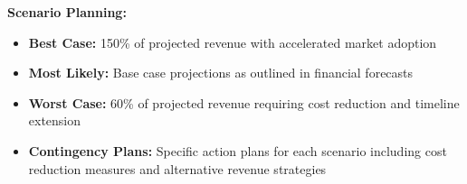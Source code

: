 \textbf{Scenario Planning:}
\begin{itemize}
    \item \textbf{Best Case:} 150\% of projected revenue with accelerated market adoption
    \item \textbf{Most Likely:} Base case projections as outlined in financial forecasts
    \item \textbf{Worst Case:} 60\% of projected revenue requiring cost reduction and timeline extension
    \item \textbf{Contingency Plans:} Specific action plans for each scenario including cost reduction measures and alternative revenue strategies
\end{itemize}